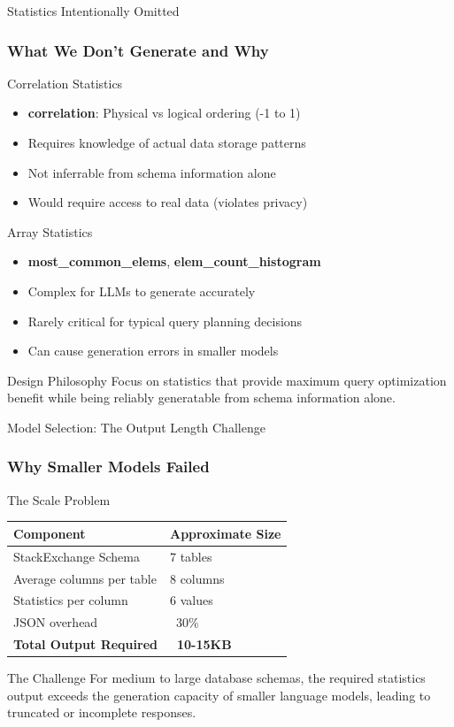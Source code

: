 \documentclass{beamer}
\begin{document}
\begin{frame}{Statistics Intentionally Omitted}
\frametitle{What We Don't Generate and Why}

\begin{alertblock}{Correlation Statistics}
\begin{itemize}
    \item \textbf{correlation}: Physical vs logical ordering (-1 to 1)
    \item Requires knowledge of actual data storage patterns
    \item Not inferrable from schema information alone
    \item Would require access to real data (violates privacy)
\end{itemize}
\end{alertblock}

\begin{alertblock}{Array Statistics}
\begin{itemize}
    \item \textbf{most\_common\_elems}, \textbf{elem\_count\_histogram}
    \item Complex for LLMs to generate accurately
    \item Rarely critical for typical query planning decisions
    \item Can cause generation errors in smaller models
\end{itemize}
\end{alertblock}

\begin{block}{Design Philosophy}
Focus on statistics that provide maximum query optimization benefit while being reliably generatable from schema information alone.
\end{block}

\end{frame}

\begin{frame}{Model Selection: The Output Length Challenge}
\frametitle{Why Smaller Models Failed}

\begin{block}{The Scale Problem}
\begin{tabular}{ll}
\toprule
Component & Approximate Size \\
\midrule
StackExchange Schema & 7 tables \\
Average columns per table & 8 columns \\
Statistics per column & 6 values \\
JSON overhead & ~30\% \\
\textbf{Total Output Required} & \textbf{~10-15KB} \\
\bottomrule
\end{tabular}
\end{block}

\begin{alertblock}{The Challenge}
For medium to large database schemas, the required statistics output exceeds the generation capacity of smaller language models, leading to truncated or incomplete responses.
\end{alertblock}

\end{frame}
\end{document}
